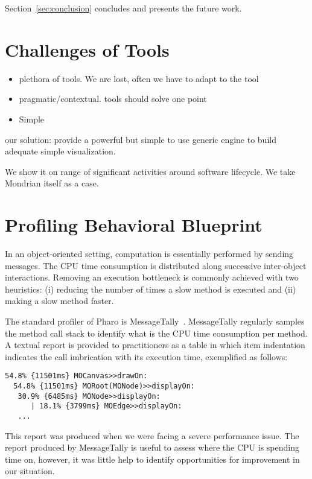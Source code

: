 \documentclass[runningheads]{llncs}
\newcommand{\seclabel}[1]{\label{sec:#1}}
\newcommand{\secref}[1]{Section~\ref{sec:#1}}
\begin{document}
\secref{conclusion} concludes and presents the future work.



\section{Challenges of Tools}

\begin{itemize}
	\item plethora of tools. We are lost, often we have to adapt to the tool
	\item pragmatic/contextual. tools should solve one point
	\item Simple
\end{itemize}

our solution: provide a powerful but simple to use generic engine to build adequate simple visualization.

We show it on range of significant activities around software lifecycle. We take Mondrian itself as a case. 


\section{Profiling Behavioral Blueprint}\seclabel{profilingblueprint}

In an object-oriented setting, computation is essentially performed by sending messages. The CPU time consumption is distributed along successive inter-object interactions. Removing an execution bottleneck is commonly achieved with two heuristics: (i) reducing the number of times a slow method is executed and (ii) making a slow method faster.

The standard profiler of Pharo is MessageTally~\cite{Berg11d}. MessageTally regularly samples the method call stack to identify what is the CPU time consumption per method. A textual report is provided to practitioners as a table in which item indentation indicates the call imbrication with its execution time, exemplified as follows: 

\begin{lstlisting}
54.8% {11501ms} MOCanvas>>drawOn: 
  54.8% {11501ms} MORoot(MONode)>>displayOn: 
   30.9% {6485ms} MONode>>displayOn: 
      | 18.1% {3799ms} MOEdge>>displayOn: 
   ...
\end{lstlisting}

This report was produced when we were facing a severe performance issue. The report produced by MessageTally is useful to assess where the CPU is spending time on, however, it was little help to identify opportunities for improvement in our situation. 
\end{document}
